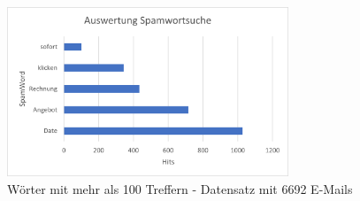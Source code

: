 \begin{figure}
    \centering
    \includegraphics[width=0.75\textwidth]{images/Merged_Auswertung_Spamwortsuche.png}
    \caption{Wörter mit mehr als 100 Treffern - Datensatz mit 6692 E-Mails} 
    \label{fig:spamwortlistegreater100merged}
\end{figure}

\newpage